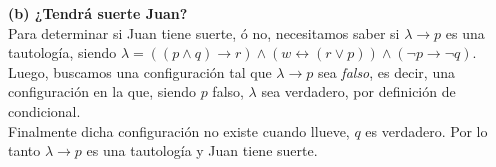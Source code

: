 \documentclass[lnbip]{svmultln}
\begin{document}
\textbf{(b) ¿Tendrá suerte Juan?} \\

Para determinar si Juan tiene suerte, ó no, necesitamos saber si $\lambda \rightarrow p$ es una tautología, siendo  $\lambda = ((p \wedge q) \rightarrow r) \wedge (w \leftrightarrow (r \vee p)) \wedge (\neg p \rightarrow \neg q)$. \\

Luego, buscamos una configuración tal que $\lambda \rightarrow p$ sea \textit{falso}, es decir, una configuración en la que, siendo $p$ falso, $\lambda$ sea verdadero, por definición de condicional. \\

Finalmente dicha configuración no existe cuando llueve, $q$ es verdadero. Por lo tanto $\lambda \rightarrow p$ es una tautología y Juan tiene suerte. \\
\end{document}
